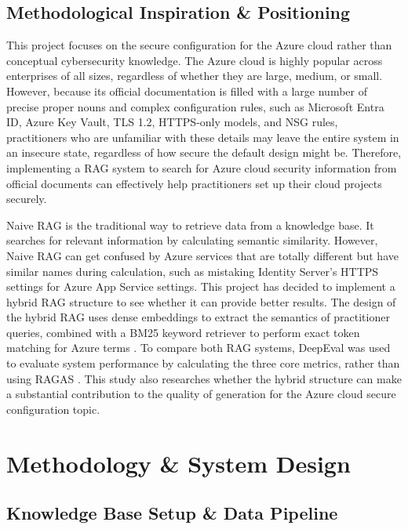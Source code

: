 \documentclass[11pt]{article}
\begin{document}
\subsection{Methodological Inspiration \& Positioning}

This project focuses on the secure configuration for the Azure cloud rather than conceptual cybersecurity knowledge. The Azure cloud is highly popular across enterprises of all sizes, regardless of whether they are large, medium, or small. However, because its official documentation is filled with a large number of precise proper nouns and complex configuration rules, such as Microsoft Entra ID, Azure Key Vault, TLS 1.2, HTTPS-only models, and NSG rules, practitioners who are unfamiliar with these details may leave the entire system in an insecure state, regardless of how secure the default design might be. Therefore, implementing a RAG system to search for Azure cloud security information from official documents can effectively help practitioners set up their cloud projects securely.

Naive RAG is the traditional way to retrieve data from a knowledge base. It searches for relevant information by calculating semantic similarity. However, Naive RAG can get confused by Azure services that are totally different but have similar names during calculation, such as mistaking Identity Server's HTTPS settings for Azure App Service settings. This project has decided to implement a hybrid RAG structure to see whether it can provide better results. The design of the hybrid RAG uses dense embeddings to extract the semantics of practitioner queries, combined with a BM25 keyword retriever to perform exact token matching for Azure terms \citep{robertson2009probabilistic}. To compare both RAG systems, DeepEval was used to evaluate system performance by calculating the three core metrics, rather than using RAGAS \citep{es2023ragas}. This study also researches whether the hybrid structure can make a substantial contribution to the quality of generation for the Azure cloud secure configuration topic.

\section{Methodology \& System Design}

\subsection{Knowledge Base Setup \& Data Pipeline}
\end{document}
